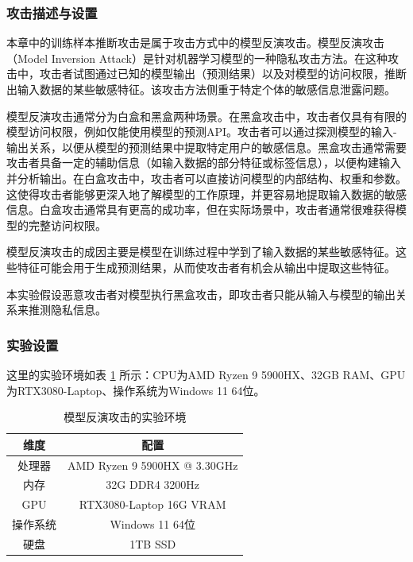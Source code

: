 \subsubsection{攻击描述与设置}

本章中的训练样本推断攻击是属于攻击方式中的模型反演攻击。模型反演攻击（Model Inversion Attack）是针对机器学习模型的一种隐私攻击方法。在这种攻击中，攻击者试图通过已知的模型输出（预测结果）以及对模型的访问权限，推断出输入数据的某些敏感特征。该攻击方法侧重于特定个体的敏感信息泄露问题。

模型反演攻击通常分为白盒和黑盒两种场景。在黑盒攻击中，攻击者仅具有有限的模型访问权限，例如仅能使用模型的预测API。攻击者可以通过探测模型的输入-输出关系，以便从模型的预测结果中提取特定用户的敏感信息。黑盒攻击通常需要攻击者具备一定的辅助信息（如输入数据的部分特征或标签信息），以便构建输入并分析输出。在白盒攻击中，攻击者可以直接访问模型的内部结构、权重和参数。这使得攻击者能够更深入地了解模型的工作原理，并更容易地提取输入数据的敏感信息。白盒攻击通常具有更高的成功率，但在实际场景中，攻击者通常很难获得模型的完整访问权限。

模型反演攻击的成因主要是模型在训练过程中学到了输入数据的某些敏感特征。这些特征可能会用于生成预测结果，从而使攻击者有机会从输出中提取这些特征。

本实验假设恶意攻击者对模型执行黑盒攻击，即攻击者只能从输入与模型的输出关系来推测隐私信息。

\subsubsection{实验设置}

这里的实验环境如表 \ref{chap3_exp1_env} 所示：CPU为AMD Ryzen 9 5900HX、32GB RAM、GPU为RTX3080-Laptop、操作系统为Windows 11 64位。

\begin{table}[]
	\centering
	\caption{模型反演攻击的实验环境}
	\begin{tabular}{|c|c|}
		\hline
		维度&配置
		\\ \hline
		
		处理器&AMD Ryzen 9 5900HX @ 3.30GHz    \\ \hline
		内存&32G DDR4 3200Hz    \\ \hline
		GPU&RTX3080-Laptop 16G VRAM    \\ \hline
		操作系统&Windows 11 64位    \\ \hline
		硬盘&1TB SSD    \\ \hline
	\end{tabular}
	\label{chap3_exp1_env}
\end{table}

